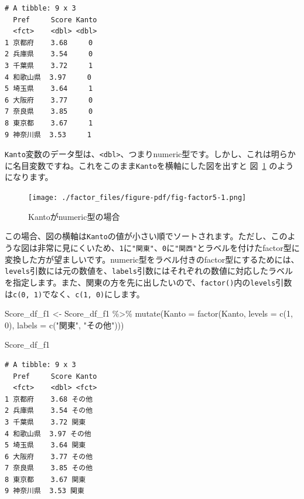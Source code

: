 \documentclass[
  a4paper,
  pandoc,
  ja=standard,
  jafont=haranoaji]{bxjsbook}
\newenvironment{Shaded}{\begin{snugshade}}{\end{snugshade}}
\newcommand{\AttributeTok}[1]{\textcolor[rgb]{0.00,0.48,0.65}{#1}}
\newcommand{\DecValTok}[1]{\textcolor[rgb]{0.68,0.00,0.00}{#1}}
\newcommand{\FunctionTok}[1]{\textcolor[rgb]{0.28,0.35,0.67}{#1}}
\newcommand{\NormalTok}[1]{\textcolor[rgb]{0.00,0.48,0.65}{#1}}
\newcommand{\OtherTok}[1]{\textcolor[rgb]{0.00,0.48,0.65}{#1}}
\newcommand{\SpecialCharTok}[1]{\textcolor[rgb]{0.37,0.37,0.37}{#1}}
\newcommand{\StringTok}[1]{\textcolor[rgb]{0.13,0.47,0.30}{#1}}
\begin{document}
\begin{verbatim}
# A tibble: 9 x 3
  Pref     Score Kanto
  <fct>    <dbl> <dbl>
1 京都府    3.68     0
2 兵庫県    3.54     0
3 千葉県    3.72     1
4 和歌山県  3.97     0
5 埼玉県    3.64     1
6 大阪府    3.77     0
7 奈良県    3.85     0
8 東京都    3.67     1
9 神奈川県  3.53     1
\end{verbatim}

\texttt{Kanto}変数のデータ型は、\texttt{\textless{}dbl\textgreater{}}、つまりnumeric型です。しかし、これは明らかに名目変数ですね。これをこのまま\texttt{Kanto}を横軸にした図を出すと
図~\ref{fig-factor5} のようになります。

\begin{figure}

{\centering \texttt{[image: ./factor\_files/figure-pdf/fig-factor5-1.png]}

}

\caption{\label{fig-factor5}Kantoがnumeric型の場合}

\end{figure}

この場合、図の横軸は\texttt{Kanto}の値が小さい順でソートされます。ただし、このような図は非常に見にくいため、\texttt{1}に\texttt{"関東"}、\texttt{0}に\texttt{"関西"}とラベルを付けたfactor型に変換した方が望ましいです。numeric型をラベル付きのfactor型にするためには、\texttt{levels}引数には元の数値を、\texttt{labels}引数にはそれぞれの数値に対応したラベルを指定します。また、関東の方を先に出したいので、\texttt{factor()}内の\texttt{levels}引数は\texttt{c(0,\ 1)}でなく、\texttt{c(1,\ 0)}にします。

\begin{Shaded}
\begin{Highlighting}[numbers=left,,]
\NormalTok{Score\_df\_f1 }\OtherTok{\textless{}{-}}\NormalTok{ Score\_df\_f1 }\SpecialCharTok{\%\textgreater{}\%}
  \FunctionTok{mutate}\NormalTok{(}\AttributeTok{Kanto =} \FunctionTok{factor}\NormalTok{(Kanto, }\AttributeTok{levels =} \FunctionTok{c}\NormalTok{(}\DecValTok{1}\NormalTok{, }\DecValTok{0}\NormalTok{), }\AttributeTok{labels =} \FunctionTok{c}\NormalTok{(}\StringTok{"関東"}\NormalTok{, }\StringTok{"その他"}\NormalTok{)))}

\NormalTok{Score\_df\_f1}
\end{Highlighting}
\end{Shaded}

\begin{verbatim}
# A tibble: 9 x 3
  Pref     Score Kanto 
  <fct>    <dbl> <fct> 
1 京都府    3.68 その他
2 兵庫県    3.54 その他
3 千葉県    3.72 関東  
4 和歌山県  3.97 その他
5 埼玉県    3.64 関東  
6 大阪府    3.77 その他
7 奈良県    3.85 その他
8 東京都    3.67 関東  
9 神奈川県  3.53 関東  
\end{verbatim}
\end{document}
